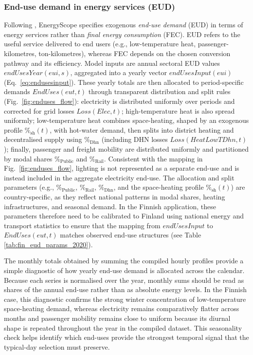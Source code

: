 \documentclass{article}
\begin{document}
\subsubsection{End-use demand in energy services (EUD)}
Following \citet{moret_strategic_2017}, EnergyScope specifies exogenous \emph{end-use demand} (EUD) in terms of energy services rather than \emph{final energy consumption} (FEC). EUD refers to the useful service delivered to end users (e.g., low-temperature heat, passenger-kilometres, ton-kilometres), whereas FEC depends on the chosen conversion pathway and its efficiency. Model inputs are annual sectoral EUD values $endUsesYear(eui,s)$, aggregated into a yearly vector $endUsesInput(eui)$ (Eq.~\eqref{eq:endusesinput}). These yearly totals are then allocated to period-specific demands $EndUses(eut,t)$ through transparent distribution and split rules (Fig.~\ref{fig:enduses_flow}): electricity is distributed uniformly over periods and corrected for grid losses $Loss(Elec,t)$; high-temperature heat is also spread uniformly; low-temperature heat combines space-heating, shaped by an exogenous profile $\%_{\mathrm{sh}}(t)$, with hot-water demand, then splits into district heating and decentralised supply using $\%_{\mathrm{Dhn}}$ (including DHN losses $Loss(HeatLowTDhn,t)$); finally, passenger and freight mobility are distributed uniformly and partitioned by modal shares $\%_{\mathrm{Public}}$ and $\%_{\mathrm{Rail}}$. Consistent with the mapping in Fig.~\ref{fig:enduses_flow}, lighting is not represented as a separate end-use and is instead included in the aggregate electricity end-use. The allocation and split parameters (e.g., $\%_{\mathrm{Public}}$, $\%_{\mathrm{Rail}}$, $\%_{\mathrm{Dhn}}$, and the space-heating profile $\%_{\mathrm{sh}}(t)$) are country-specific, as they reflect national patterns in modal shares, heating infrastructures, and seasonal demand. In the Finnish application, these parameters therefore need to be calibrated to Finland using national energy and transport statistics to ensure that the mapping from $endUsesInput$ to $EndUses(eut,t)$ matches observed end-use structures (see Table \ref{tab:fin_eud_params_2020}).


The monthly totals obtained by summing the compiled hourly profiles provide a simple diagnostic of how yearly end-use demand is allocated across the calendar. Because each series is normalised over the year, monthly sums should be read as shares of the annual end-use rather than as absolute energy levels. In the Finnish case, this diagnostic confirms the strong winter concentration of low-temperature space-heating demand, whereas electricity remains comparatively flatter across months and passenger mobility remains close to uniform because its diurnal shape is repeated throughout the year in the compiled dataset. This seasonality check helps identify which end-uses provide the strongest temporal signal that the typical-day selection must preserve.
\end{document}
